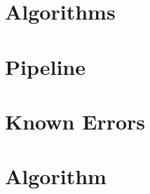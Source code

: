 \documentclass[5p]{elsarticle}
\begin{document}
\section{Algorithms}
\section{Pipeline}
\section{Known Errors}


\section{Algorithm}

%
%



\end{document}
